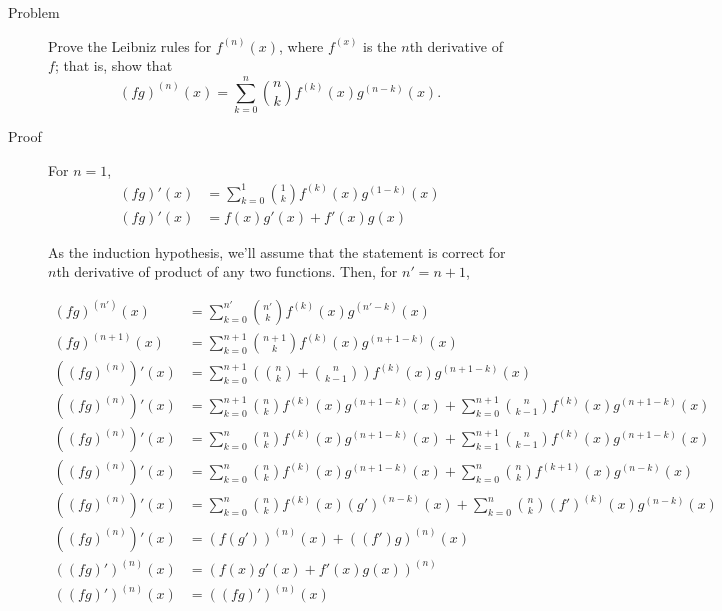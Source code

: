 \begin{description}
\item[Problem] Prove the Leibniz rules for $f^{(n)} (x)$, where $f^{(x)}$ is
the $n$th derivative of $f$; that is, show that
$$(fg)^{(n)}(x) = \sum\limits_{k = 0}^n {n \choose k} f^{(k)}(x)g^{(n-k)}(x).$$

\item[Proof] For $n = 1$,
\begin{align*}
(fg)'(x) &= \sum\limits_{k = 0}^1 {1 \choose k} f^{(k)}(x)g^{(1-k)}(x) \\
(fg)'(x) &= f(x)g'(x) + f'(x)g(x)
\end{align*}

As the induction hypothesis, we'll assume that the statement is correct for
$n$th derivative of product of any two functions. Then, for $n' = n + 1$,

\begin{align*}
(fg)^{(n')}(x) &= \sum\limits_{k = 0}^{n'} {n' \choose k}
f^{(k)}(x)g^{(n'-k)}(x) \\
(fg)^{(n+1)}(x) &= \sum\limits_{k = 0}^{n+1} {n+1 \choose k}
f^{(k)}(x)g^{(n+1-k)}(x) \\
\left((fg)^{(n)}\right)'(x) &=
\sum\limits_{k = 0}^{n+1} \left({n \choose k} + {n \choose k - 1}\right)
f^{(k)}(x)g^{(n+1-k)}(x) \\
\left((fg)^{(n)}\right)'(x) &=
\sum\limits_{k = 0}^{n+1} {n \choose k} f^{(k)}(x)g^{(n+1-k)}(x) +
\sum\limits_{k = 0}^{n+1} {n \choose k - 1} f^{(k)}(x)g^{(n+1-k)}(x) \\
\left((fg)^{(n)}\right)'(x) &=
\sum\limits_{k = 0}^{n} {n \choose k} f^{(k)}(x)g^{(n+1-k)}(x) +
\sum\limits_{k = 1}^{n+1} {n \choose k - 1} f^{(k)}(x)g^{(n+1-k)}(x) \\
\left((fg)^{(n)}\right)'(x) &=
\sum\limits_{k = 0}^{n} {n \choose k} f^{(k)}(x)g^{(n+1-k)}(x) +
\sum\limits_{k = 0}^{n} {n \choose k} f^{(k + 1)}(x)g^{(n-k)}(x) \\
\left((fg)^{(n)}\right)'(x) &=
\sum\limits_{k = 0}^{n} {n \choose k} f^{(k)}(x)(g')^{(n-k)}(x) +
\sum\limits_{k = 0}^{n} {n \choose k} (f')^{(k)}(x)g^{(n-k)}(x) \\
\left((fg)^{(n)}\right)'(x) &= (f(g'))^{(n)}(x) + ((f')g)^{(n)}(x) \\
((fg)')^{(n)}(x) &= \left(f(x)g'(x) + f'(x)g(x)\right)^{(n)} \\
((fg)')^{(n)}(x) &= ((fg)')^{(n)}(x)
\end{align*}

\end{description}
